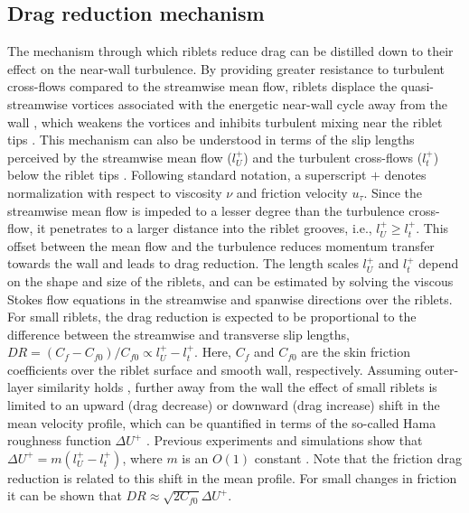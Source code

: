 \documentclass[letterpaper,11pt]{article}
\begin{document}
\subsection{Drag reduction mechanism}\label{sec:mechanism}
The mechanism through which riblets reduce drag can be distilled down to their effect on the near-wall turbulence. By providing greater resistance to turbulent cross-flows compared to the streamwise mean flow, riblets displace the quasi-streamwise vortices associated with the energetic near-wall cycle away from the wall \citep{robinson1991coherent,jimenez_pinelli_1999}, which weakens the vortices and inhibits turbulent mixing near the riblet tips \citep{luchini1991resistance,choi1993direct,jimenez2001turbulent}.  This mechanism can also be understood in terms of the slip lengths perceived by the streamwise mean flow ($l_U^+$) and the turbulent cross-flows ($l_t^+$) below the riblet tips \citep{luchini1991resistance}.  Following standard notation, a superscript $+$ denotes normalization with respect to viscosity $\nu$ and friction velocity $u_\tau$. Since the streamwise mean flow is impeded to a lesser degree than the turbulence cross-flow, it penetrates to a larger distance into the riblet grooves, i.e., $l_U^+ \ge l_t^+$. This offset between the mean flow and the turbulence reduces momentum transfer towards the wall and leads to drag reduction. The length scales $l_U^+$ and $l_t^+$ depend on the shape and size of the riblets, and can be estimated by solving the viscous Stokes flow equations in the streamwise and spanwise directions over the riblets. For small riblets, the drag reduction is expected to be proportional to the difference between the streamwise and transverse slip lengths, $DR = (C_f - C_{f0})/C_{f0} \propto l_U^+ - l_t^+$.  Here, $C_f$ and $C_{f0}$ are the skin friction coefficients over the riblet surface and smooth wall, respectively.  Assuming outer-layer similarity holds \citep[e.g.,][]{flack2007examination}, further away from the wall the effect of small riblets is limited to an upward (drag decrease) or downward (drag increase) shift in the mean velocity profile, which can be quantified in terms of the so-called Hama roughness function $\Delta U^+$ \citep[see e.g.,][]{hama1954boundary,jimenez2004turbulent}.  Previous experiments and simulations show that $\Delta U^+ = m(l_U^+ - l_t^+)$, where $m$ is an $O(1)$ constant \citep[e.g.,][]{bechert1997experiments,garcia2011hydrodynamic,garcia2019control}. Note that the friction drag reduction is related to this shift in the mean profile. For small changes in friction it can be shown that $DR \approx \sqrt{2 C_{f0}} \Delta U^+$.  
\end{document}
